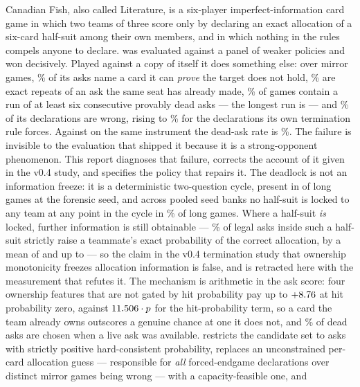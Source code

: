 Canadian Fish, also called Literature, is a six-player imperfect-information card
game in which two teams of three score only by declaring an exact allocation of a
six-card half-suit among their own members, and in which nothing in the rules
compels anyone to declare. \vfour{} was evaluated against a panel of weaker
policies and won decisively. Played against a copy of itself it does something
else: over \numMirrorGames{} mirror games, \numDeadAsk\% of its asks name a card
it can \emph{prove} the target does not hold, \numRepeatAsk\% are exact repeats
of an ask the same seat has already made, \numDeadRunGames\% of games contain a
run of at least six consecutive provably dead asks --- the longest run is
\numDeadRunLongest{} --- and \numDeclWrong\% of its declarations are wrong,
rising to \numPostHorizonWrong\% for the declarations its own termination rule
forces. Against \vthree{} on the same instrument the dead-ask rate is
\numVthreeDeadAsk\%. The failure is invisible to the evaluation that shipped it
because it is a strong-opponent phenomenon.
This report diagnoses that failure, corrects the account of it given in the v0.4
study, and specifies the policy that repairs it. The deadlock is not an
information freeze: it is a deterministic two-question cycle, present in
\numPureCycle{} of \numLongGames{} long games at the forensic seed, and across
pooled seed banks no half-suit is locked to any team at any point in the cycle
in \numNoLockPct\% of long games. Where a
half-suit \emph{is} locked, further information is still obtainable ---
\numCertRate\% of legal asks inside such a half-suit strictly raise a teammate's
exact probability of the correct allocation, by a mean of \numCertMean{} and up
to \numCertMax{} --- so the claim in the v0.4 termination study that ownership
monotonicity freezes allocation information is false, and is retracted here with
the measurement that refutes it. The mechanism is arithmetic in the ask score:
four ownership features that are not gated by hit probability pay up to
$+8.76$ at hit probability zero, against $11.506 \cdot p$ for
the hit-probability term, so a card the team already owns outscores a genuine
chance at one it does not, and \numVoluntaryDead\% of dead asks are chosen when a
live ask was available. \vfive{} restricts the candidate set to asks with
strictly positive hard-consistent probability, replaces an unconstrained
per-card allocation guess ---
responsible for \emph{all} \numForcedN{} forced-endgame declarations over
\numForcedGames{} distinct mirror games being wrong --- with a capacity-feasible one, and
